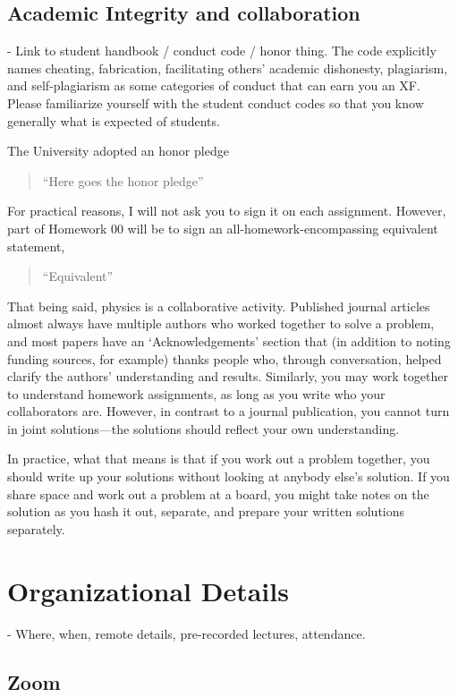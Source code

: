 \clearpage
\subsection*{Academic Integrity and collaboration}

 - Link to student handbook / conduct code / honor thing.
The code explicitly names cheating, fabrication, facilitating others' academic dishonesty, plagiarism, and self-plagiarism as some categories of conduct that can earn you an XF.
Please familiarize yourself with the student conduct codes so that you know generally what is expected of students.

The University adopted an honor pledge
\begin{quote}
	``Here goes the honor pledge''
\end{quote}
For practical reasons, I will not ask you to sign it on each assignment.
However, part of Homework 00 will be to sign an all-homework-encompassing equivalent statement,
\begin{quote}
	``Equivalent''
\end{quote}

That being said, physics is a collaborative activity.
Published journal articles almost always have multiple authors who worked together to solve a problem, and most papers have an `Acknowledgements' section that (in addition to noting funding sources, for example) thanks people who, through conversation, helped clarify the authors' understanding and results.
Similarly, you may work together to understand homework assignments, as long as you write who your collaborators are.
However, in contrast to a journal publication, you cannot turn in joint solutions---the solutions should reflect your own understanding.

In practice, what that means is that if you work out a problem together, you should write up your solutions without looking at anybody else's solution.
If you share space and work out a problem at a board, you might take notes on the solution as you hash it out, separate, and prepare your written solutions separately.

\section{Organizational Details}

 - Where, when, remote details, pre-recorded lectures, attendance.

\subsection*{Zoom}

